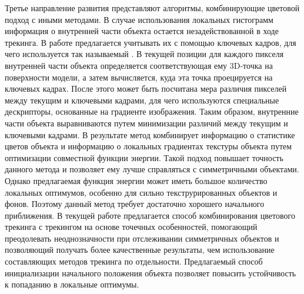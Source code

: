 Третье направление развития представляют алгоритмы, комбинирующие
цветовой подход с иными методами.
В случае использования локальных гистограмм информация о внутренней части
объекта остается незадействованной в ходе трекинга.
В работе \cite{Zhong2018} предлагается учитывать их с помощью ключевых
кадров, для чего используется так называемый .
В текущей позиции для каждого пикселя внутренней части объекта
определяется соответствующая ему 3D-точка на поверхности модели,
а затем вычисляется, куда эта точка проецируется на ключевых кадрах.
После этого может быть посчитана мера различия пикселей между текущим и
ключевыми кадрами, для чего используются специальные дескрипторы, основанные на
градиенте изображения.
Таким образом, внутренние части объекта выравниваются путем минимизации
различий между текущим и ключевыми кадрами.
В результате метод \cite{Zhong2018} комбинирует информацию о статистике цветов
объекта и информацию о локальных градиентах текстуры объекта путем оптимизации
совместной функции энергии.
Такой подход повышает точность данного метода и позволяет ему лучше справляться
с симметричными объектами.
Однако предлагаемая функция энергии может иметь большое количество локальных
оптимумов, особенно для сильно текструрированных объектов и фонов.
Поэтому данный метод требует достаточно хорошего начального приближения.
В текущей работе предлагается способ комбинирования цветового трекинга с
трекингом на основе точечных особенностей, помогающий преодолевать
неоднозначности при отслеживании симметричных объектов и позволяющий получать
более качественные результаты, чем использование составляющих методов
трекинга по отдельности.
Предлагаемый способ инициализации начального положения объекта позволяет
повысить устойчивость к попаданию в локальные оптимумы.
